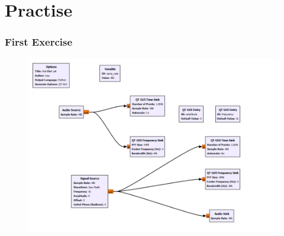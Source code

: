 \section{Practise}
\begin{frame}
	\frametitle{First Exercise}
    
\begin{figure}
    \centering
    \includegraphics[width=0.8\linewidth]{img/applications/primeiro exercicio.png}
    \label{fig:enter-label}
\end{figure}
\end{frame}
